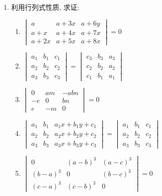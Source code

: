 \begin{enumerate}
\item 利用行列式性质, 求证:
\begin{enumerate}
\item $\begin{vmatrix}a & a+3 x & a+6 y \\ a+x & a+4 x & a+7 x \\ a+2 x & a+5 x & a+8 x\end{vmatrix}=0$
\item $\begin{vmatrix}a_{1} & b_{1} & c_{1} \\ a_{2} & b_{2} & c_{2} \\ a_{3} & b_{3} & c_{3}\end{vmatrix}=\begin{vmatrix}c_{3} & b_{3} & a_{3} \\ c_{2} & b_{2} & a_{2} \\ c_{1} & b_{1} & a_{1}\end{vmatrix}$
\item $\begin{vmatrix}0 & a m & -a b n \\ -e & 0 & b n \\ e & -m & 0\end{vmatrix}=0$
\item $\begin{vmatrix}a_{1} & b_{1} & a_{1} x+b_{1} y+c_{1} \\ a_{2} & b_{2} & a_{2} x+b_{2} y+c_{2} \\ a_{3} & b_{3} & a_{3} x+b_{3} y+c_{3}\end{vmatrix}=\begin{vmatrix}a_{1} & b_{1} & c_{1} \\ a_{2} & b_{2} & c_{2} \\ a_{3} & b_{3} & c_{3}\end{vmatrix}$
\item $\begin{vmatrix}0 & (a-b)^{3} & (a-c)^{3} \\ (b-a)^{3} & 0 & (b-c)^{3} \\ (c-a)^{3} & (c-b)^{3} & 0\end{vmatrix}=0$
\end{enumerate}



\end{enumerate}
